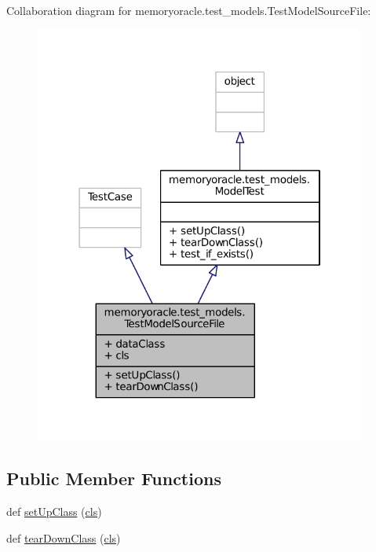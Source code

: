 Collaboration diagram for memoryoracle.\+test\+\_\+models.\+Test\+Model\+Source\+File\+:\nopagebreak
\begin{figure}[H]
\begin{center}
\leavevmode
\includegraphics[width=310pt]{classmemoryoracle_1_1test__models_1_1TestModelSourceFile__coll__graph}
\end{center}
\end{figure}
\subsection*{Public Member Functions}
\begin{DoxyCompactItemize}
\item 
def \hyperlink{classmemoryoracle_1_1test__models_1_1TestModelSourceFile_ac56e4e037daed006a2d750037175cfaf}{set\+Up\+Class} (\hyperlink{classmemoryoracle_1_1test__models_1_1TestModelSourceFile_abafaa71375af2cd6a3638c8810ff740d}{cls})
\item 
def \hyperlink{classmemoryoracle_1_1test__models_1_1TestModelSourceFile_ae141bc0a17cc5e9f07e6aa713d8fd77e}{tear\+Down\+Class} (\hyperlink{classmemoryoracle_1_1test__models_1_1TestModelSourceFile_abafaa71375af2cd6a3638c8810ff740d}{cls})
\end{DoxyCompactItemize}
